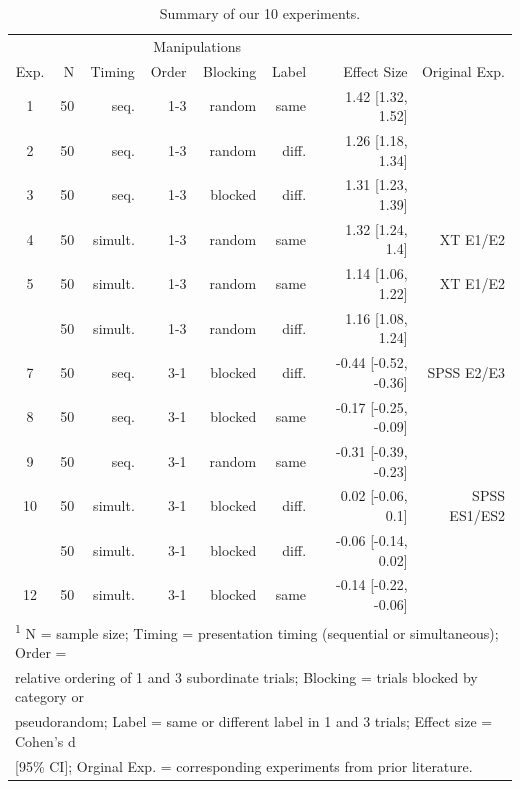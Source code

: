 \documentclass[english,floatsintext,man]{apa6}
\theoremstyle{definition}
\theoremstyle{definition}
\theoremstyle{remark}
\begin{document}
\begin{table}

\caption{\label{tab:unnamed-chunk-3}Summary of our 10 experiments.}
\centering
\fontsize{12}{14}\selectfont
\begin{tabular}[t]{crrrrrrr}
\toprule
\multicolumn{2}{c}{ } & \multicolumn{4}{c}{Manipulations} & \multicolumn{1}{c}{ } \\
\cmidrule(l{2pt}r{2pt}){3-6}
Exp. & N & Timing & Order & Blocking & Label & Effect Size & Original 
Exp.\\
\midrule
1 & 50 & seq. & 1-3 & random & same & 1.42 [1.32, 1.52] & \\
2 & 50 & seq. & 1-3 & random & diff. & 1.26 [1.18, 1.34] & \\
3 & 50 & seq. & 1-3 & blocked & diff. & 1.31 [1.23, 1.39] & \\
4 & 50 & simult. & 1-3 & random & same & 1.32 [1.24, 1.4] & XT E1/E2\\
5 & 50 & simult. & 1-3 & random & same & 1.14 [1.06, 1.22] & XT E1/E2\\
\addlinespace
6 & 50 & simult. & 1-3 & random & diff. & 1.16 [1.08, 1.24] & \\
7 & 50 & seq. & 3-1 & blocked & diff. & -0.44 [-0.52, -0.36] & SPSS E2/E3\\
8 & 50 & seq. & 3-1 & blocked & same & -0.17 [-0.25, -0.09] & \\
9 & 50 & seq. & 3-1 & random & same & -0.31 [-0.39, -0.23] & \\
10 & 50 & simult. & 3-1 & blocked & diff. & 0.02 [-0.06, 0.1] & SPSS ES1/ES2\\
\addlinespace
11 & 50 & simult. & 3-1 & blocked & diff. & -0.06 [-0.14, 0.02] & \\
12 & 50 & simult. & 3-1 & blocked & same & -0.14 [-0.22, -0.06] & \\
\bottomrule
\multicolumn{8}{l}{\textsuperscript{1} N = sample size; Timing = presentation timing (sequential or simultaneous); Order =}\\
\multicolumn{8}{l}{relative ordering of 1 and 3 subordinate trials; Blocking = trials blocked by category or}\\
\multicolumn{8}{l}{pseudorandom; Label = same or different label in 1 and 3 trials; Effect size = Cohen's d}\\
\multicolumn{8}{l}{[95\% CI]; Orginal Exp. = corresponding experiments from prior literature.}\\
\end{tabular}
\end{table}
\end{document}
